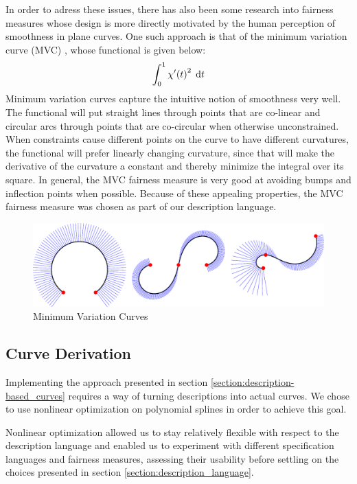 \documentclass[a4paper]{article}
\begin{document}
				In order to adress these issues, there has also been some research into fairness measures whose design is more directly motivated by the human perception of smoothness in plane curves. One such approach is that of the minimum variation curve (MVC) \cite{thesis-mvc}, whose functional is given below:
				\begin{equation*}
					\int_{0}^{1} \chi'\!\left( t \right)^2 \; \mathrm{d}t
				\end{equation*}
				Minimum variation curves capture the intuitive notion of smoothness very well. The functional will put straight lines through points that are co-linear and circular arcs through points that are co-circular when otherwise unconstrained. When constraints cause different points on the curve to have different curvatures, the functional will prefer linearly changing curvature, since that will make the derivative of the curvature a constant and thereby minimize the integral over its square. In general, the MVC fairness measure is very good at avoiding bumps and inflection points when possible. Because of these appealing properties, the MVC fairness measure was chosen as part of our description language.

				\begin{figure}[htbp]
					\centering
					\includegraphics[width=\textwidth]{content/output/fairness_mvc.pdf}
					\caption{Minimum Variation Curves}
					\label{figure:minimum_variation_curves}
				\end{figure}

		\subsection{Curve Derivation}
		\label{section:curve_derivation}

			Implementing the approach presented in section \ref{section:description-based_curves} requires a way of turning descriptions into actual curves. We chose to use nonlinear optimization on polynomial splines in order to achieve this goal.

			Nonlinear optimization allowed us to stay relatively flexible with respect to the description language and enabled us to experiment with different specification languages and fairness measures, assessing their usability before settling on the choices presented in section \ref{section:description_language}.
\end{document}
